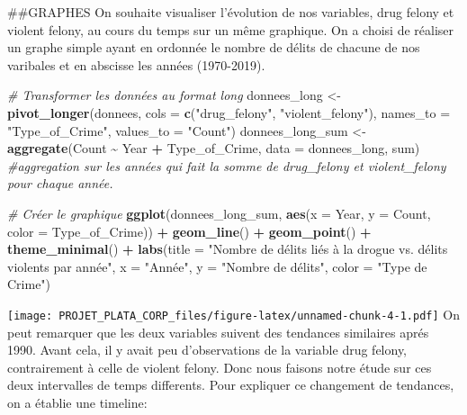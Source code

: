 \documentclass[
]{article}
\newenvironment{Shaded}{\begin{snugshade}}{\end{snugshade}}
\newcommand{\AttributeTok}[1]{\textcolor[rgb]{0.13,0.29,0.53}{#1}}
\newcommand{\CommentTok}[1]{\textcolor[rgb]{0.56,0.35,0.01}{\textit{#1}}}
\newcommand{\FunctionTok}[1]{\textcolor[rgb]{0.13,0.29,0.53}{\textbf{#1}}}
\newcommand{\NormalTok}[1]{#1}
\newcommand{\OtherTok}[1]{\textcolor[rgb]{0.56,0.35,0.01}{#1}}
\newcommand{\SpecialCharTok}[1]{\textcolor[rgb]{0.81,0.36,0.00}{\textbf{#1}}}
\newcommand{\StringTok}[1]{\textcolor[rgb]{0.31,0.60,0.02}{#1}}
\begin{document}
\#\#GRAPHES On souhaite visualiser l'évolution de nos variables, drug
felony et violent felony, au cours du temps sur un même graphique. On a
choisi de réaliser un graphe simple ayant en ordonnée le nombre de
délits de chacune de nos varibales et en abscisse les années
(1970-2019).

\begin{Shaded}
\begin{Highlighting}[]
\CommentTok{\# Transformer les données au format long}
\NormalTok{donnees\_long }\OtherTok{\textless{}{-}} \FunctionTok{pivot\_longer}\NormalTok{(donnees,}
                             \AttributeTok{cols =} \FunctionTok{c}\NormalTok{(}\StringTok{"drug\_felony"}\NormalTok{, }\StringTok{"violent\_felony"}\NormalTok{),}
                             \AttributeTok{names\_to =} \StringTok{"Type\_of\_Crime"}\NormalTok{,}
                             \AttributeTok{values\_to =} \StringTok{"Count"}\NormalTok{)}
\NormalTok{donnees\_long\_sum }\OtherTok{\textless{}{-}} \FunctionTok{aggregate}\NormalTok{(Count }\SpecialCharTok{\textasciitilde{}}\NormalTok{ Year }\SpecialCharTok{+}\NormalTok{ Type\_of\_Crime, }\AttributeTok{data =}\NormalTok{ donnees\_long, sum) }\CommentTok{\#aggregation sur les années qui fait la somme de drug\_felony et violent\_felony pour chaque année.}

\CommentTok{\# Créer le graphique}
\FunctionTok{ggplot}\NormalTok{(donnees\_long\_sum, }\FunctionTok{aes}\NormalTok{(}\AttributeTok{x =}\NormalTok{ Year, }\AttributeTok{y =}\NormalTok{ Count, }\AttributeTok{color =}\NormalTok{ Type\_of\_Crime)) }\SpecialCharTok{+}
  \FunctionTok{geom\_line}\NormalTok{() }\SpecialCharTok{+}
  \FunctionTok{geom\_point}\NormalTok{() }\SpecialCharTok{+}
  \FunctionTok{theme\_minimal}\NormalTok{() }\SpecialCharTok{+}
  \FunctionTok{labs}\NormalTok{(}\AttributeTok{title =} \StringTok{"Nombre de délits liés à la drogue vs. délits violents par année"}\NormalTok{,}
       \AttributeTok{x =} \StringTok{"Année"}\NormalTok{,}
       \AttributeTok{y =} \StringTok{"Nombre de délits"}\NormalTok{,}
       \AttributeTok{color =} \StringTok{"Type de Crime"}\NormalTok{)}
\end{Highlighting}
\end{Shaded}

\texttt{[image: PROJET\_PLATA\_CORP\_files/figure-latex/unnamed-chunk-4-1.pdf]}
On peut remarquer que les deux variables suivent des tendances
similaires aprés 1990. Avant cela, il y avait peu d'observations de la
variable drug felony, contrairement à celle de violent felony. Donc nous
faisons notre étude sur ces deux intervalles de temps differents. Pour
expliquer ce changement de tendances, on a établie une timeline:
\end{document}
